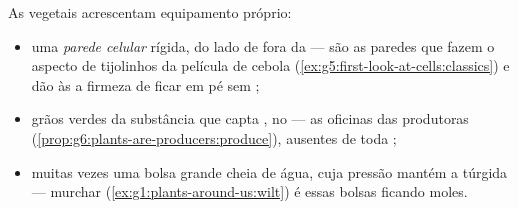 \begin{proposition}\label{prop:g6:cell-unit-of-life:plantextras}
As  vegetais acrescentam equipamento próprio:
\begin{itemize}
  \item uma \emph{parede celular} rígida, do
        lado de fora da  --- são as paredes que fazem o
        aspecto de tijolinhos da película de cebola
        (\cref{ex:g5:first-look-at-cells:classics}) e dão às  a
        firmeza de ficar em pé sem ;
  \item grãos verdes da substância que capta , no  ---
        as oficinas das produtoras
        (\cref{prop:g6:plants-are-producers:produce}), ausentes de
        toda  ;
  \item muitas vezes uma bolsa grande cheia de água, cuja pressão
        mantém a  túrgida --- murchar
        (\cref{ex:g1:plants-around-us:wilt}) é essas bolsas ficando
        moles.
\end{itemize}
\end{proposition}
\admitted

